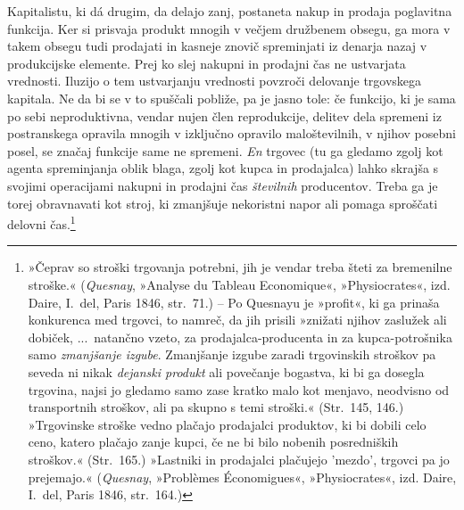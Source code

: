 \documentclass[kapital_02.tex]{subfiles}
\begin{document}
Kapitalistu, ki dá drugim, da delajo zanj, postaneta nakup in prodaja poglavitna funkcija.
Ker si prisvaja produkt mnogih v večjem družbenem obsegu, ga mora v takem obsegu tudi prodajati in kasneje znovič spreminjati iz denarja nazaj v produkcijske elemente.
Prej ko slej nakupni in prodajni čas ne ustvarjata vrednosti.
Iluzijo o tem ustvarjanju vrednosti povzroči delovanje trgovskega kapitala.
Ne da bi se v to spuščali pobliže, pa je jasno tole: če funkcijo, ki je sama po sebi neproduktivna, vendar nujen člen reprodukcije, delitev dela spremeni iz postranskega opravila mnogih v izključno opravilo maloštevilnih, v njihov posebni posel, se značaj funkcije same ne spremeni.
\emph{En} trgovec (tu ga gledamo zgolj kot agenta spreminjanja oblik blaga, zgolj kot kupca in prodajalca) lahko skrajša s svojimi operacijami nakupni in prodajni čas \emph{številnih} producentov.
Treba ga je torej obravnavati kot stroj, ki zmanjšuje nekoristni napor ali pomaga sproščati delovni čas.\footnote{»Čeprav so stroški trgovanja potrebni, jih je vendar treba šteti za bremenilne stroške.« (\emph{Quesnay}, »Analyse du Tableau Economique«, »Physiocrates«, izd. Daire, I.\ del, Paris 1846, str.\ 71.) -- Po Quesnayu je »profit«, ki ga prinaša konkurenca med trgovci, to namreč, da jih prisili »znižati njihov zaslužek ali dobiček, ...\ natančno vzeto, za prodajalca-producenta in za kupca-potrošnika samo \emph{zmanjšanje izgube}.
Zmanjšanje izgube zaradi trgovinskih stroškov pa seveda ni nikak \emph{dejanski produkt} ali povečanje bogastva, ki bi ga dosegla trgovina, najsi jo gledamo samo zase kratko malo kot menjavo, neodvisno od transportnih stroškov, ali pa skupno s temi stroški.«
(Str.\ 145, 146.) »Trgovinske stroške vedno plačajo prodajalci produktov, ki bi dobili celo ceno, katero plačajo zanje kupci, če ne bi bilo nobenih posredniških stroškov.« (Str.\ 165.)
»Lastniki in prodajalci plačujejo 'mezdo', trgovci pa jo prejemajo.«
(\emph{Quesnay}, »Problèmes Économigues«, »Physiocrates«, izd. Daire, I.\ del, Paris 1846, str.\ 164.)}
\end{document}
